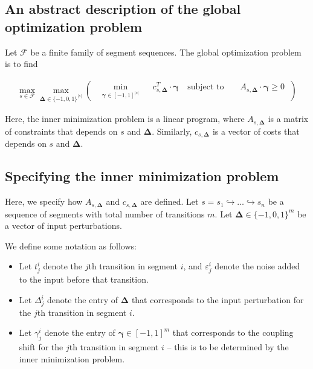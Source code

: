 \documentclass{article}
\renewcommand{\epsilon}{\varepsilon}
\begin{document}
\subsection{An abstract description of the global optimization problem}

Let $\mathcal{F}$ be a finite family of segment sequences. The global optimization problem is to find 

\begin{align*}
\max_{s \in \mathcal{F}} \max_{\boldsymbol{\Delta} \in {\{-1, 0, 1\}}^{|s|}} \left(
\begin{aligned}
& \underset{\boldsymbol{\gamma} \in [-1, 1]^{|s|}}{\min} & &  c_{s , \boldsymbol{\Delta}}^T \cdot \boldsymbol{\gamma}  \
& \text{subject to } & & A_{s, \boldsymbol{\Delta}} \cdot \boldsymbol{\gamma} \geq 0 \
\end{aligned}
\right)
\end{align*}

Here, the inner minimization problem is a linear program, where $A_{s, \boldsymbol{\Delta}}$ is a matrix of constraints that depends on $s$ and $\boldsymbol{\Delta}$. Similarly, $c_{s, \boldsymbol{\Delta}}$ is a vector of costs that depends on $s$ and $\boldsymbol{\Delta}$.

\subsection{Specifying the inner minimization problem}

Here, we specify how $A_{s, \boldsymbol{\Delta}}$ and $c_{s, \boldsymbol{\Delta}}$ are defined. Let $s = s_1 \hookrightarrow \dots \hookrightarrow s_n$ be a sequence of segments with total number of transitions $m$. Let $\boldsymbol{\Delta} \in \{-1, 0, 1\}^m$ be a vector of input perturbations.

We define some notation as follows: 

\begin{itemize}
    \item Let $t^i_j$ denote the $j$th transition in segment $i$, and $\epsilon^i_j$ denote the noise added to the input before that transition.
    \item Let $\Delta^i_j$ denote the entry of $\boldsymbol{\Delta}$ that corresponds to the input perturbation for the $j$th transition in segment $i$.
    \item Let $\gamma^i_j$ denote the entry of $\boldsymbol{\gamma} \in [-1, 1]^m$ that corresponds to the coupling shift for the $j$th transition in segment $i$ -- this is to be determined by the inner minimization problem.
\end{itemize}
\end{document}
